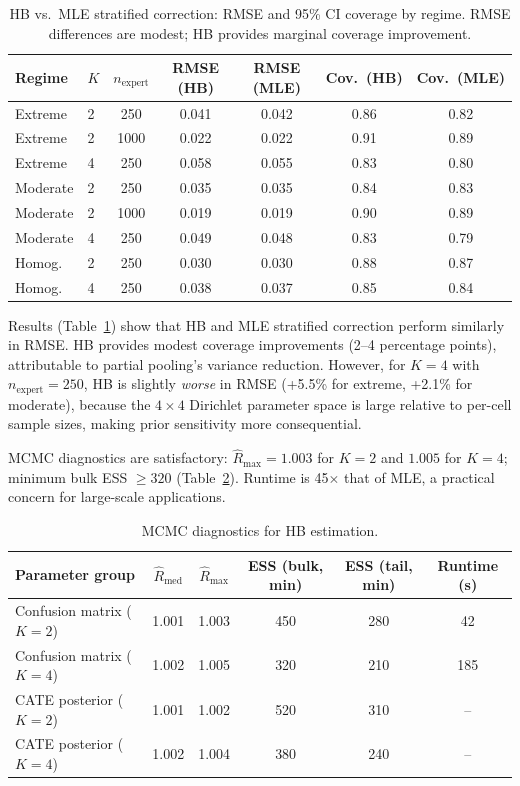 \documentclass[11pt,a4paper]{article}
\begin{document}
\begin{table}[t]
\centering
\caption{HB vs.\ MLE stratified correction: RMSE and 95\% CI coverage by regime. RMSE differences are modest; HB provides marginal coverage improvement.}
\label{tab:hb_vs_mle}
\begin{tabular}{@{}llccccc@{}}
\toprule
Regime & $K$ & $n_{\text{expert}}$ & RMSE (HB) & RMSE (MLE) & Cov.\ (HB) & Cov.\ (MLE) \\
\midrule
Extreme  & 2 & 250  & 0.041 & 0.042 & 0.86 & 0.82 \\
Extreme  & 2 & 1000 & 0.022 & 0.022 & 0.91 & 0.89 \\
Extreme  & 4 & 250  & 0.058 & 0.055 & 0.83 & 0.80 \\
Moderate & 2 & 250  & 0.035 & 0.035 & 0.84 & 0.83 \\
Moderate & 2 & 1000 & 0.019 & 0.019 & 0.90 & 0.89 \\
Moderate & 4 & 250  & 0.049 & 0.048 & 0.83 & 0.79 \\
Homog.   & 2 & 250  & 0.030 & 0.030 & 0.88 & 0.87 \\
Homog.   & 4 & 250  & 0.038 & 0.037 & 0.85 & 0.84 \\
\bottomrule
\end{tabular}
\end{table}

Results (Table~\ref{tab:hb_vs_mle}) show that HB and MLE stratified correction perform similarly in RMSE. HB provides modest coverage improvements (2--4 percentage points), attributable to partial pooling's variance reduction. However, for $K{=}4$ with $n_{\text{expert}}{=}250$, HB is slightly \emph{worse} in RMSE (+5.5\% for extreme, +2.1\% for moderate), because the $4 \times 4$ Dirichlet parameter space is large relative to per-cell sample sizes, making prior sensitivity more consequential.

MCMC diagnostics are satisfactory: $\hat{R}_{\max} = 1.003$ for $K{=}2$ and $1.005$ for $K{=}4$; minimum bulk ESS $\geq 320$ (Table~\ref{tab:mcmc_diag}). Runtime is 45$\times$ that of MLE, a practical concern for large-scale applications.

\begin{table}[t]
\centering
\caption{MCMC diagnostics for HB estimation.}
\label{tab:mcmc_diag}
\begin{tabular}{@{}lccccc@{}}
\toprule
Parameter group & $\hat{R}_{\text{med}}$ & $\hat{R}_{\max}$ & ESS (bulk, min) & ESS (tail, min) & Runtime (s) \\
\midrule
Confusion matrix ($K{=}2$) & 1.001 & 1.003 & 450 & 280 & 42 \\
Confusion matrix ($K{=}4$) & 1.002 & 1.005 & 320 & 210 & 185 \\
CATE posterior ($K{=}2$) & 1.001 & 1.002 & 520 & 310 & -- \\
CATE posterior ($K{=}4$) & 1.002 & 1.004 & 380 & 240 & -- \\
\bottomrule
\end{tabular}
\end{table}
\end{document}
